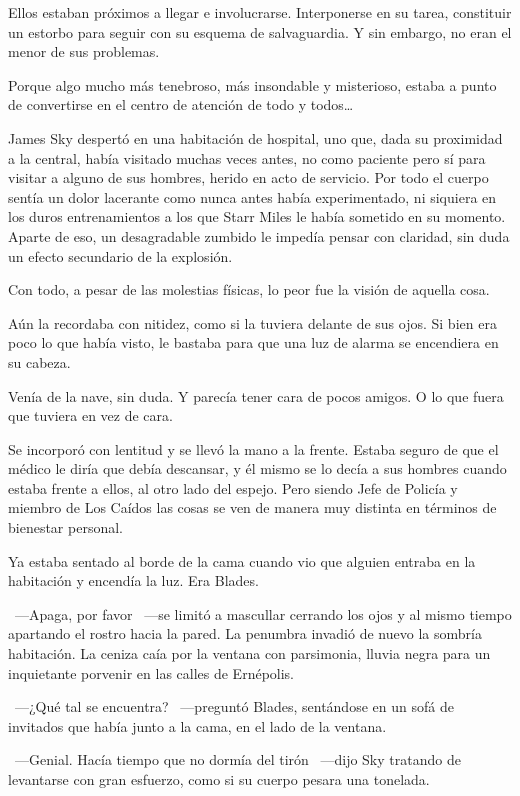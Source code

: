 Ellos estaban próximos a llegar e involucrarse. Interponerse en su tarea, constituir un estorbo para seguir con su esquema de salvaguardia. Y sin embargo, no eran el menor de sus problemas.

Porque algo mucho más tenebroso, más insondable y misterioso, estaba a punto de convertirse en el centro de atención de todo y todos\dots

\fancyparbreak
James Sky despertó en una habitación de hospital, uno que, dada su proximidad a la central, había visitado muchas veces antes, no como paciente pero sí para visitar a alguno de sus hombres, herido en acto de servicio. Por todo el cuerpo sentía un dolor lacerante como nunca antes había experimentado, ni siquiera en los duros entrenamientos a los que Starr Miles le había sometido en su momento. Aparte de eso, un desagradable zumbido le impedía pensar con claridad, sin duda un efecto secundario de la explosión.

Con todo, a pesar de las molestias físicas, lo peor fue la visión de aquella cosa.

Aún la recordaba con nitidez, como si la tuviera delante de sus ojos. Si bien era poco lo que había visto, le bastaba para que una luz de alarma se encendiera en su cabeza.

Venía de la nave, sin duda. Y parecía tener cara de pocos amigos. O lo que fuera que tuviera en vez de cara.

Se incorporó con lentitud y se llevó la mano a la frente. Estaba seguro de que el médico le diría que debía descansar, y él mismo se lo decía a sus hombres cuando estaba frente a ellos, al otro lado del espejo. Pero siendo Jefe de Policía y miembro de Los Caídos las cosas se ven de manera muy distinta en términos de bienestar personal.

Ya estaba sentado al borde de la cama cuando vio que alguien entraba en la habitación y encendía la luz. Era Blades.

~---Apaga, por favor ~---se limitó a mascullar cerrando los ojos y al mismo tiempo apartando el rostro hacia la pared. La penumbra invadió de nuevo la sombría habitación. La ceniza caía por la ventana con parsimonia, lluvia negra para un inquietante porvenir en las calles de Ernépolis.

~---¿Qué tal se encuentra? ~---preguntó Blades, sentándose en un sofá de invitados que había junto a la cama, en el lado de la ventana.

~---Genial. Hacía tiempo que no dormía del tirón ~---dijo Sky tratando de levantarse con gran esfuerzo, como si su cuerpo pesara una tonelada.

